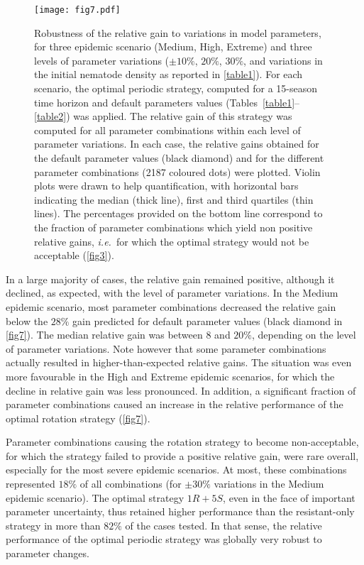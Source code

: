 {{{{\begin{figure}[htp]
  \centering
   \texttt{[image: fig7.pdf]} 
  \caption[Robustness of the relative gain to variations in model
    parameters]{Robustness of the relative gain to variations in model
    parameters, for three epidemic scenario (Medium, High, Extreme)
    and three levels of parameter variations ($\pm 10\%$, $20\%$,
    $30\%$, and variations in the initial nematode density as reported
    in \autoref{table1}). For each scenario, the optimal periodic
    strategy, computed for a 15-season time horizon and default
    parameters values (Tables~\ref{table1}--\ref{table2}) was
    applied. The relative gain of this strategy was computed for all
    parameter combinations within each level of parameter
    variations. In each case, the relative gains obtained for the
    default parameter values (black diamond) and for the different
    parameter combinations (2187 coloured dots) were plotted. Violin
    plots were drawn to help quantification, with horizontal bars
    indicating the median (thick line), first and third quartiles
    (thin lines). The percentages provided on the bottom line
    correspond to the fraction of parameter combinations which yield
    non positive relative gains, \textit{i.e.}\ for which the optimal
    strategy would not be acceptable (\autoref{fig3}).}
  \label{fig7} 
\end{figure}

In a large majority of cases, the relative gain remained positive,
although it declined, as expected, with the level of parameter
variations.  In the Medium epidemic scenario, most parameter
combinations decreased the relative gain below the $28\%$ gain
predicted for default parameter values (black diamond in
\autoref{fig7}). The median relative gain was between $8$ and $20\%$,
depending on the level of parameter variations. Note however
that some parameter combinations actually resulted in
higher-than-expected relative gains.  The situation was even more
favourable in the High and Extreme epidemic scenarios, for which the
decline in relative gain was less pronounced. In addition, a
significant fraction of parameter combinations caused an increase in
the relative performance of the optimal rotation strategy
(\autoref{fig7}).

Parameter combinations causing the rotation strategy to become
non-acceptable,  for which the strategy failed to provide a
positive relative gain, were rare overall, especially for the most
severe epidemic scenarios. At most, these combinations represented
$18\%$ of all combinations (for $\pm 30\%$ variations in the Medium
epidemic scenario). The optimal strategy $1R+5S$, even in the face of
important parameter uncertainty, thus retained higher performance than
the resistant-only strategy in more than $82\%$ of the cases
tested. In that sense, the relative performance of the optimal
periodic strategy was globally very robust to parameter changes.


}}}}
